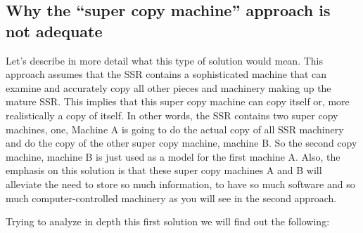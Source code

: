 \bigskip

\subsection[Why the “super copy machine” approach is not adequate]{Why
the “super copy machine” approach is not adequate}
\hypertarget{RefHeading3120306210128}{}Let’s describe in more detail
what this type of solution would mean. This approach assumes that the
SSR contains a sophisticated machine that can examine and accurately
copy all other pieces and machinery making up the mature SSR. This
implies that this super copy machine can copy itself or, more
realistically a copy of itself. In other words, the SSR contains two
super copy machines, one, Machine A is going to do the actual copy of
all SSR machinery and do the copy of the other super copy machine,
machine B. So the second copy machine, machine B is just used as a
model for the first machine A. Also, the emphasis on this solution is
that these super copy machines A and B will alleviate the need to store
so much information, to have so much software and so much
computer-controlled machinery as you will see in the second approach.


\bigskip

Trying to analyze in depth this first solution we will find out the
following:


\bigskip

